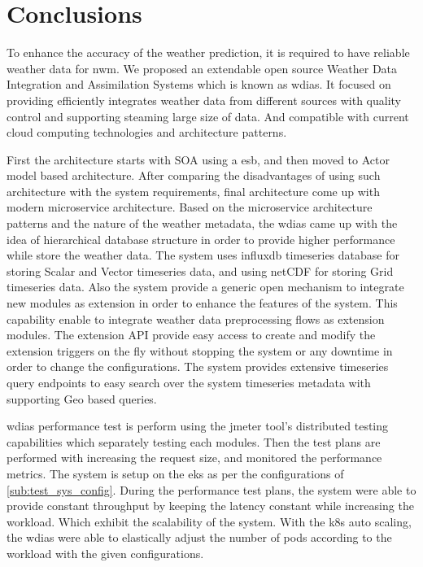 \section{Conclusions}

To enhance the accuracy of the weather prediction, it is required to have reliable weather data for \acrshort{nwm}. 
We proposed an extendable open source Weather Data Integration and Assimilation Systems which is known as \acrshort{wdias}. It focused on providing efficiently integrates weather data from different sources with quality control and supporting steaming large size of data. And compatible with current cloud computing technologies and architecture patterns.

First the architecture starts with SOA using a \acrfull{esb}, and then moved to Actor model based architecture. After comparing the disadvantages of using such architecture with the system requirements, final architecture come up with modern microservice architecture.
Based on the microservice architecture patterns and the nature of the weather metadata, the \acrshort{wdias} came up with the idea of hierarchical database structure in order to provide higher performance while store the weather data. The system uses \acrshort{influxdb} timeseries database for storing Scalar and Vector timeseries data, and using \acrshort{netCDF} for storing Grid timeseries data.
Also the system provide a generic open mechanism to integrate new modules as extension in order to enhance the features of the system. This capability enable to integrate weather data preprocessing flows as extension modules.
The extension API provide easy access to create and modify the extension triggers on the fly without stopping the system or any downtime in order to change the configurations.
The system provides extensive timeseries query endpoints to easy search over the system timeseries metadata with supporting Geo based queries.

\acrshort{wdias} performance test is perform using the \acrshort{jmeter} tool's distributed testing capabilities which separately testing each modules. Then the test plans are performed with increasing the request size, and monitored the performance metrics. The system is setup on the \acrfull{eks} as per the configurations of \ref{sub:test_sys_config}.
During the performance test plans, the system were able to provide constant throughput by keeping the latency constant while increasing the workload. Which exhibit the scalability of the system.
With the \acrshort{k8s} auto scaling, the \acrshort{wdias} were able to elastically adjust the number of pods according to the workload with the given configurations.
